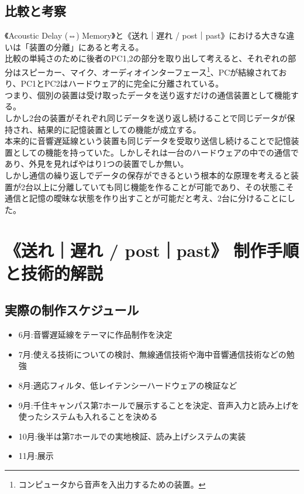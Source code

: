 \documentclass[a4paper,report]{jsbook}
\begin{document}
\section{比較と考察}\label{ux6bd4ux8f03ux3068ux8003ux5bdf}

《Acoustic Delay (⇔) Memory》と《送れ｜遅れ /
post｜past》における大きな違いは「装置の分離」にあると考える。\\
比較の単純さのために後者のPC1,2の部分を取り出して考えると、それぞれの部分はスピーカー、マイク、オーディオインターフェース\footnote{コンピュータから音声を入出力するための装置。}、PCが結線されており、PC1とPC2はハードウェア的に完全に分離されている。\\
つまり、個別の装置は受け取ったデータを送り返すだけの通信装置として機能する。\\
しかし2台の装置がそれぞれ同じデータを送り返し続けることで同じデータが保持され、結果的に記憶装置としての機能が成立する。\\
本来的に音響遅延線という装置も同じデータを受取り送信し続けることで記憶装置としての機能を持っていた。しかしそれは一台のハードウェアの中での通信であり、外見を見ればやはり1つの装置でしか無い。\\
しかし通信の繰り返しでデータの保存ができるという根本的な原理を考えると装置が2台以上に分離していても同じ機能を作ることが可能であり、その状態こそ通信と記憶の曖昧な状態を作り出すことが可能だと考え、2台に分けることにした。

\chapter{《送れ｜遅れ / post｜past》
制作手順と技術的解説}\label{ux9001ux308cux9045ux308c-postpast-ux5236ux4f5cux624bux9806ux3068ux6280ux8853ux7684ux89e3ux8aac}

\section{実際の制作スケジュール}\label{ux5b9fux969bux306eux5236ux4f5cux30b9ux30b1ux30b8ux30e5ux30fcux30eb}

\begin{itemize}
\tightlist
\item
  6月:音響遅延線をテーマに作品制作を決定
\item
  7月:使える技術についての検討、無線通信技術や海中音響通信技術などの勉強
\item
  8月:適応フィルタ、低レイテンシーハードウェアの検証など
\item
  9月:千住キャンパス第7ホールで展示することを決定、音声入力と読み上げを使ったシステムも入れることを決める
\item
  10月:後半は第7ホールでの実地検証、読み上げシステムの実装
\item
  11月:展示
\end{itemize}
\end{document}
